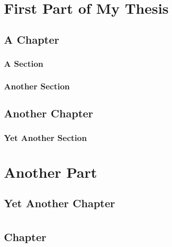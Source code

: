 \documentclass[
  twoside,
  11pt, a4paper,
  footinclude=true,
  headinclude=true,
  cleardoublepage=empty
]{scrbook}
\begin{document}


\part{First Part of My Thesis}

\chapter{A Chapter}
\lipsum[1] %

\section{A Section}
\lipsum[1] %

\section{Another Section}
\lipsum[1] %

\chapter{Another Chapter}
\lipsum[1] %

\section{Yet Another Section}
\lipsum[1] %

\part{Another Part}

\chapter{Yet Another Chapter}
\lipsum[1] %
  
\part{}
\chapter{Chapter}
\lipsum[1]
    
\end{document}

